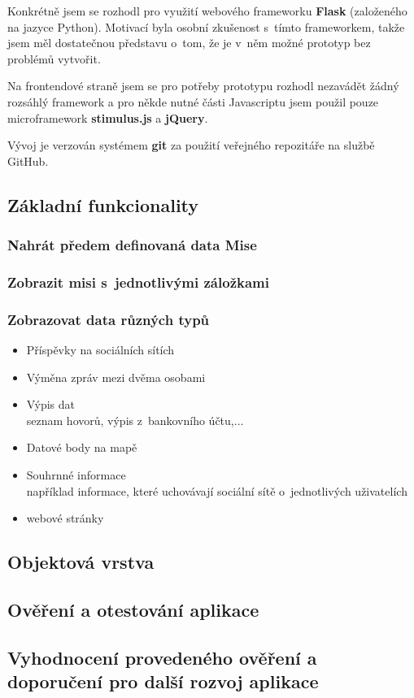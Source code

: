 Konkrétně jsem se rozhodl pro využití webového frameworku \textbf{Flask} (založeného na jazyce Python). Motivací byla osobní zkušenost s~tímto frameworkem, takže jsem měl dostatečnou představu o~tom, že je v~něm možné prototyp bez problémů vytvořit.

Na frontendové straně jsem se pro potřeby prototypu rozhodl nezavádět žádný rozsáhlý framework a pro někde nutné části Javascriptu jsem použil pouze microframework \textbf{stimulus.js} a \textbf{jQuery}.

Vývoj je verzován systémem \textbf{git} za použití veřejného repozitáře na službě GitHub.

\subsection{Základní funkcionality}
\subsubsection*{Nahrát předem definovaná data Mise}
\subsubsection*{Zobrazit misi s~jednotlivými záložkami}
\subsubsection*{Zobrazovat data různých typů}
\begin{itemize}
	\item Příspěvky na sociálních sítích
	\item Výměna zpráv mezi dvěma osobami
	\item Výpis dat\\
		seznam hovorů, výpis z~bankovního účtu,...
	\item Datové body na mapě
	\item Souhrnné informace\\
		například informace, které uchovávají sociální sítě o~jednotlivých uživatelích
	\item webové stránky
\end{itemize}

\subsection{Objektová vrstva}

\subsection{Ověření a otestování aplikace}
\subsection{Vyhodnocení provedeného ověření a doporučení pro další rozvoj aplikace}